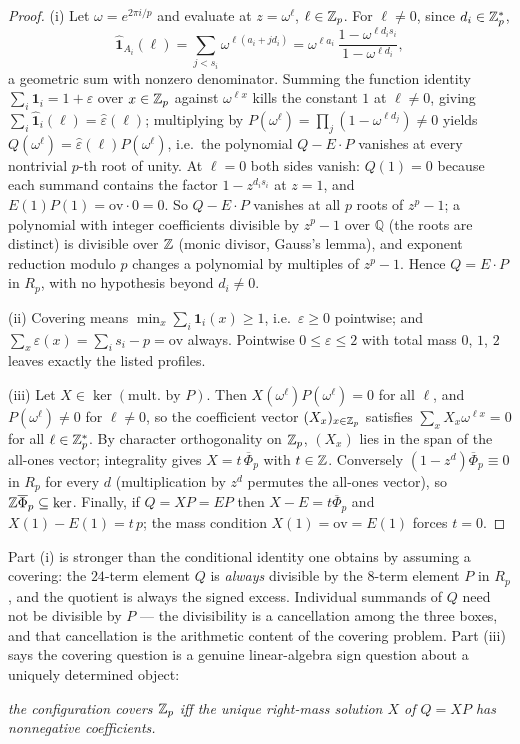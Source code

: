 \begin{proof}
(i) Let $\omega=e^{2\pi i/p}$ and evaluate at $z=\omega^\ell$,
$\ell\in\mathbb{Z}_p$. For $\ell\ne 0$, since $d_i\in\mathbb{Z}_p^{*}$,
\[
\widehat{\mathbf 1}_{A_i}(\ell)
=\sum_{j<s_i}\omega^{\ell(a_i+jd_i)}
=\omega^{\ell a_i}\,\frac{1-\omega^{\ell d_i s_i}}{1-\omega^{\ell d_i}},
\]
a geometric sum with nonzero denominator. Summing the function identity
$\sum_i\mathbf 1_i=1+\varepsilon$ over $x\in\mathbb{Z}_p$ against $\omega^{\ell x}$
kills the constant $1$ at $\ell\ne0$, giving
$\sum_i\widehat{\mathbf 1}_i(\ell)=\widehat\varepsilon(\ell)$; multiplying by
$P(\omega^\ell)=\prod_j(1-\omega^{\ell d_j})\ne 0$ yields
$Q(\omega^\ell)=\widehat\varepsilon(\ell)P(\omega^\ell)$, i.e.\ the
polynomial $Q-E\cdot P$ vanishes at every nontrivial $p$-th root of unity.
At $\ell=0$ both sides vanish: $Q(1)=0$ because each summand contains the
factor $1-z^{d_is_i}$ at $z=1$, and $E(1)P(1)=\mathrm{ov}\cdot 0=0$. So
$Q-E\cdot P$ vanishes at all $p$ roots of $z^p-1$; a polynomial with integer
coefficients divisible by $z^p-1$ over $\mathbb{Q}$ (the roots are distinct) is
divisible over $\mathbb{Z}$ (monic divisor, Gauss's lemma), and exponent reduction
modulo $p$ changes a polynomial by multiples of $z^p-1$. Hence
$Q=E\cdot P$ in $R_p$, with no hypothesis beyond $d_i\ne 0$.

(ii) Covering means $\min_x\sum_i\mathbf 1_i(x)\ge 1$, i.e.\ $\varepsilon\ge
0$ pointwise; and $\sum_x\varepsilon(x)=\sum_i s_i-p=\mathrm{ov}$ always.
Pointwise $0\le\varepsilon\le 2$ with total mass $0$, $1$, $2$ leaves exactly
the listed profiles.

(iii) Let $X\in\ker(\text{mult.\ by }P)$. Then $X(\omega^\ell)P
(\omega^\ell)=0$ for all $\ell$, and $P(\omega^\ell)\ne 0$ for $\ell\ne 0$,
so the coefficient vector $(X_x)_{x\in\mathbb{Z}_p}$ satisfies
$\sum_x X_x\omega^{\ell x}=0$ for all $\ell\in\mathbb{Z}_p^{*}$. By character
orthogonality on $\mathbb{Z}_p$, $(X_x)$ lies in the span of the all-ones vector;
integrality gives $X=t\,\overline\Phi_p$ with $t\in\mathbb{Z}$. Conversely
$(1-z^{d})\overline\Phi_p\equiv 0$ in $R_p$ for every $d$ (multiplication by
$z^d$ permutes the all-ones vector), so $\mathbb{Z}\overline\Phi_p\subseteq\ker$.
Finally, if $Q=XP=EP$ then $X-E=t\overline\Phi_p$ and
$X(1)-E(1)=t\,p$; the mass condition $X(1)=\mathrm{ov}=E(1)$ forces $t=0$.
\end{proof}

Part (i) is stronger than the conditional identity one obtains by assuming a
covering: the $24$-term element $Q$ is \emph{always} divisible by the
$8$-term element $P$ in $R_p$, and the quotient is always the signed excess.
Individual summands of $Q$ need not be divisible by $P$ --- the divisibility
is a cancellation among the three boxes, and that cancellation is the
arithmetic content of the covering problem. Part (iii) says the covering
question is a genuine linear-algebra sign question about a uniquely
determined object:
\begin{center}
\emph{the configuration covers $\mathbb{Z}_p$ iff the unique right-mass
solution $X$ of $Q=XP$ has nonnegative coefficients.}
\end{center}

